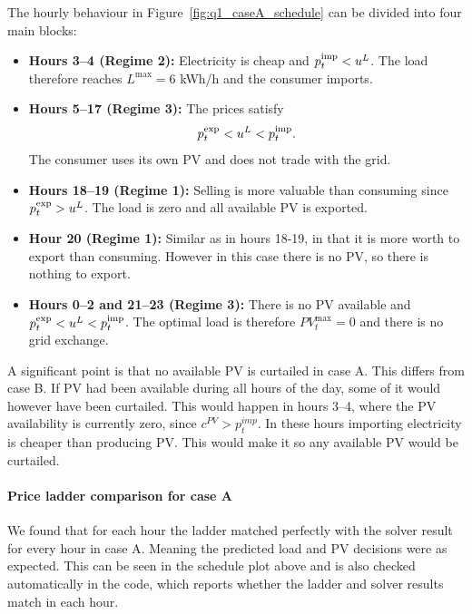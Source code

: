 The hourly behaviour in Figure~\ref{fig:q1_caseA_schedule} can be divided into four
main blocks:

\begin{itemize}
    \item \textbf{Hours 3--4 (Regime 2):} Electricity is cheap and
    $p^{\mathrm{imp}}_{t} < u^L$. The load therefore reaches $L^{\max}=6$ kWh/h and
    the consumer imports.

    \item \textbf{Hours 5--17 (Regime 3):} The prices satisfy
    \[
        p^{\mathrm{exp}}_{t} < u^L < p^{\mathrm{imp}}_{t}.
    \]
    The consumer uses its own PV and does not trade with the grid.

    \item \textbf{Hours 18--19 (Regime 1):} Selling is more valuable than
    consuming since $p^{\mathrm{exp}}_{t} > u^L$. The load is zero and all available PV
    is exported.

    \item \textbf{Hour 20 (Regime 1):} Similar as in hours 18-19, in that it is more worth to export than consuming. However in this case there is no PV, so there is nothing to export.

    \item \textbf{Hours 0--2 and 21--23 (Regime 3):} There is no PV available
    and $p^{\mathrm{exp}}_{t} < u^L < p^{\mathrm{imp}}_{t}$. The optimal load is therefore
    $PV_t^{\max}=0$ and there is no grid exchange.
\end{itemize}

A significant point is that no available PV is curtailed in case A. This differs from case B. If PV had been available during all hours of the day, some of it would however have been curtailed. This would happen in hours 3--4, where the PV availability is currently zero, since $c^{PV} > p_t^{imp}$. In these hours importing electricity is cheaper than producing PV. This would make it so any available PV would be curtailed.

\paragraph{Price ladder comparison for case A}
We found that for each hour the ladder matched perfectly with the solver result for every hour in case A. Meaning the predicted load and PV decisions were as expected. This can be seen in the schedule plot above and is also checked automatically in the code, which reports whether the ladder and solver results match in each hour.

